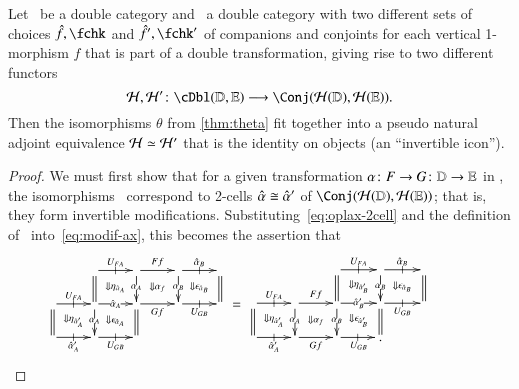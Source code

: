 \begin{lem}\label{thm:h-locfr-uniq}
  Let \lD\ be a double category and \lE\ a double category
  with two different sets of choices $\fhat,\fchk$ and $\fhat',\fchk'$
  of companions and conjoints for each vertical 1-morphism $f$ that is part of a double transformation, giving
  rise to two different functors
  \[\cH,\cH'\maps \cDbl(\lD,\lE)\too \Conj(\cH(\lD),\cH(\lE)).\]
  Then the isomorphisms $\theta$ from \autoref{thm:theta} fit together
  into a pseudo natural adjoint equivalence $\mathcal{H}\simeq \mathcal{H}'$ that is the
  identity on objects (an ``invertible icon'').
\end{lem}
\begin{proof}
  We must first show that for a given transformation $\alpha\colon F\to
  G\colon \mathbb{D}\to\mathbb{E}$ in \cDbl, the isomorphisms \th\ correspond to 2-cells $\hat{\alpha} \cong \hat{\alpha}'$ of $\Conj(\cH(\lD),\cH(\lE))$; that is, they form invertible
  modifications.
  Substituting~\eqref{eq:oplax-2cell} and the definition of \th\
  into~\eqref{eq:modif-ax}, this becomes the assertion that
  \begin{equation}
    \vcenter{\xymatrix@R=1.5pc@C=2pc{
        &
        \ar[r]|-@{|}^{U_{FA}}\ar@{=}[d] \ar@{}[dr]|{\Downarrow \eta_{\hat{\alpha}_A}} &
        \ar[r]^{Ff}\ar[d]|{\al_A} \ar@{}[dr]|{\Downarrow \al_f} &
        \ar[r]|-@{|}^{\alhat_B}\ar[d]|{\al_B} \ar@{}[dr]|{\Downarrow \epsilon_{\hat{\alpha}_B}} &
        \ar@{=}[d]\\
        \ar[r]|-@{|}^{U_{FA}} \ar@{=}[d] \ar@{}[dr]|{\Downarrow \eta_{\hat{\alpha}_A'}} &
        \ar[r]|{\alhat_A} \ar[d]|{\al_A} \ar@{}[dr]|{\Downarrow \epsilon_{\hat{\alpha}_A}}&
        \ar[r]_{Gf}  \ar@{=}[d] &
        \ar[r]|-@{|}_{U_{GB}} & \\
        \ar[r]|-@{|}_{\alhat_A'} & \ar[r]|-@{|}_{U_{GB}}&&
      }} \;=\;
    \vcenter{\xymatrix@R=1.5pc@C=2pc{
        && \ar@{=}[d] \ar[r]|-@{|}^{U_{FA}} \ar@{}[dr]|{\Downarrow \eta_{\hat{\alpha}_B'}} &
        \ar[d]|{\al_B} \ar[r]|-@{|}^{\alhat_B} \ar@{}[dr]|{\Downarrow \epsilon_{\hat{\alpha}_B}}
        &
        \ar@{=}[d] &\\
        \ar[r]|-@{|}^{U_{FA}}\ar@{=}[d] \ar@{}[dr]|{\Downarrow \eta_{\hat{\alpha}_A'}} &
        \ar[r]^{Ff}\ar[d]|{\al_A} \ar@{}[dr]|{\Downarrow \al_f} &
        \ar[r]|{\alhat_B'}\ar[d]|{\al_B} \ar@{}[dr]|{\Downarrow \epsilon_{\hat{\alpha}_B'}} &
        \ar@{=}[d] \ar[r]|-@{|}_{U_{GB}}&\\
        \ar[r]|-@{|}_{\alhat_A'} &
        \ar[r]_{Gf} &
        \ar[r]|-@{|}_{U_{GB}} & .
      }}
  \end{equation}

\end{proof}
